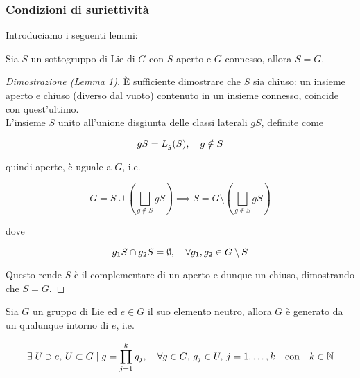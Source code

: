 \subsubsection{Condizioni di suriettività}

Introduciamo i seguenti lemmi:

\begin{lemma}[1]
	Sia $ S $ un sottogruppo di Lie di $ G $ con $ S $ aperto e $ G $ connesso, allora $ S = G $.
\end{lemma}

\begin{proof}[Dimostrazione (Lemma 1)]
	\`{E} sufficiente dimostrare che $ S $ sia chiuso: un insieme aperto e chiuso (diverso dal vuoto) contenuto in un insieme connesso, coincide con quest'ultimo.\\
	L'insieme $ S $ unito all'unione disgiunta delle classi laterali $ g S $, definite come
	
	\begin{equation}
		g S = L_{g}(S) \qcomma g \notin S
	\end{equation}
	
	quindi aperte, è uguale a $ G $, i.e.
	
	\begin{equation}
		G = S \cup \left( \bigsqcup_{g \notin S} g S \right) \implies S = G \setminus \left( \bigsqcup_{g \notin S} g S \right)
	\end{equation}
	
	dove
	
	\begin{equation}
		g_{1} S \cap g_{2} S = \emptyset \qcomma \forall g_{1},g_{2} \in G \setminus S
	\end{equation}
	
	Questo rende $ S $ è il complementare di un aperto e dunque un chiuso, dimostrando che $ S = G $.
\end{proof}

\begin{lemma}[2]
	Sia $ G $ un gruppo di Lie ed $ e \in G $ il suo elemento neutro, allora $ G $ è generato da un qualunque intorno di $ e $, i.e.
	
	\begin{equation}
		\E U \ni e, \, U \subset G \mid g = \prod_{j=1}^{k} g_{j} \qcomma \forall g \in G, \, g_{j} \in U, \, j=1,\dots,k \qq{con} k \in \N
	\end{equation}
\end{lemma}

